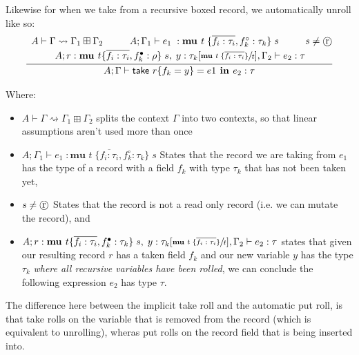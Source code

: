 Likewise for when we \textsf{take} from a recursive boxed record, 
we automatically unroll like so:
\begin{align*}
    \infer{
        A;\Gamma \vdash \textsf{take } r \{ f_k = y \} = e1 \textbf{ in } e_2 : \tau
    }{
        \begin{array}{c@{}c@{}c@{}c@{}}
            A \vdash \Gamma \rightsquigarrow \Gamma_1 \boxplus \Gamma_2 
            &
            A;\Gamma_1 \vdash e_1\; : \textbf{mu } t\; \{ \overline{f_i : \tau_i}, f_k^\circ : \tau_k \}\; s 
            &
            s \neq \text{\textcircled{r}}   \vspace{0.25em} \\
            &
            \hspace{-5em}A; r : \textbf{mu } t \{ \overline{f_i : \tau_i}, f_k^\bullet : \rho \}\; s
            ,\; y : \tau_k[\sfrac{ \textbf{mu } t\; \{\overline{f_i : \tau_i} \}}{t}], \Gamma_2 \vdash e_2 : \tau
        \end{array}
    }
\end{align*}

Where:
\begin{itemize}
    \item $A \vdash \Gamma \rightsquigarrow \Gamma_1 \boxplus \Gamma_2$ splits the context $\Gamma$ into two contexts, so that linear assumptions aren't used 
          more than once
    \item $A;\Gamma_1 \vdash e_1\; : \textbf{mu } t\; \{ \overline{f_i : \tau_i}, f_k^\circ : \tau_k \}\; s$ States that the record we are taking from $e_1$
          has the type of a record with a field $f_k$ with type $\tau_k$ that has not been taken yet,
    \item $s \neq \text{\textcircled{r}}   \vspace{0.5em}$ States that the record is not a read only record (i.e. we can mutate the record), and
    \item $A; r : \textbf{mu } t \{ \overline{f_i : \tau_i}, f_k^\bullet : \tau_k \}\; s
            ,\; y : \tau_k[\sfrac{ \textbf{mu } t\; \{\overline{f_i : \tau_i} \}}{t}], \Gamma_2 \vdash e_2 : \tau$
          states that given our resulting record $r$ has a taken field $f_k$ and our new variable $y$ has the type $\tau_k$ \textit{where all recursive variables have been rolled},
          we can conclude the following expression $e_2$ has type $\tau$.
\end{itemize}

The difference here between the implicit \textsf{take} roll and the automatic \textsf{put} roll, is that \textsf{take} rolls on the variable that is removed from the record
(which is equivalent to unrolling), wheras \textsf{put} rolls on the record field that is being inserted into.

